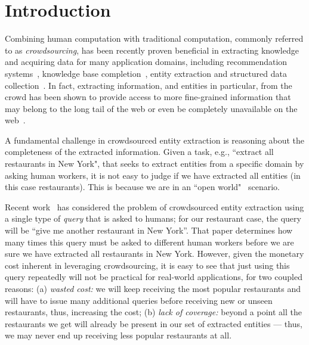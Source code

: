 


\section{Introduction}
\label{sec:intro}
Combining human computation with traditional computation, commonly referred to as {\em crowdsourcing}, has been recently proven beneficial in extracting knowledge and acquiring data for many application domains, including recommendation systems~\cite{amsterdamer:2014}, knowledge base completion~\cite{kondredi:2014}, entity extraction and structured data collection~\cite{park:2014,trushkowsky:2013}. In fact, extracting information, and entities in particular, from the crowd has been shown to provide access to more fine-grained information that may belong to the long tail of the web or even be completely unavailable on the web~\cite{franklin:2011, Parameswaran:2012, west:2014}.

A fundamental challenge in crowdsourced entity extraction is reasoning about the completeness of the extracted information. Given a task, e.g., ``extract all restaurants in New York",  that seeks to extract entities from a specific domain by asking human workers, it is not easy to judge if we have extracted all entities (in this case restaurants). This is because we are in an ``open world"~\cite{franklin:2011} scenario. 

Recent work~\cite{trushkowsky:2013} has considered the problem of crowdsourced entity extraction using a single type of {\em query} that is asked to humans; for our restaurant case, the query will be ``give me another restaurant in New York''. That paper determines how many times this query must be asked to different human workers before we are sure we have extracted all restaurants in New York. However, given the monetary cost inherent in leveraging crowdsourcing, it is easy to see that just using this query repeatedly will not be practical for real-world applications, for two coupled reasons: (a) {\em wasted cost:} we will keep receiving the most popular restaurants and will have to issue many additional queries before receiving new or unseen restaurants, thus, increasing the cost; (b) {\em lack of coverage:}  beyond a point all the restaurants we get will already be present in our set of extracted entities --- thus, we may never end up receiving less popular restaurants at all.

